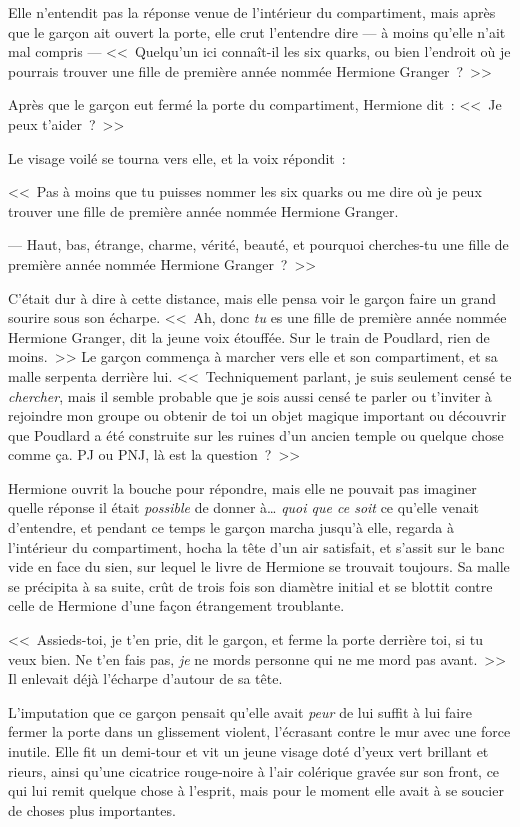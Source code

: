 Elle n'entendit pas la réponse venue de l'intérieur du compartiment, mais après que le garçon ait ouvert la porte, elle crut l'entendre dire — à moins qu'elle n'ait mal compris — <<~Quelqu'un ici connaît-il les six quarks, ou bien l'endroit où je pourrais trouver une fille de première année nommée Hermione Granger~?~>>

Après que le garçon eut fermé la porte du compartiment, Hermione dit~: <<~Je peux t'aider~?~>>

Le visage voilé se tourna vers elle, et la voix répondit~:

<<~Pas à moins que tu puisses nommer les six quarks ou me dire où je peux trouver une fille de première année nommée Hermione Granger.

--- Haut, bas, étrange, charme, vérité, beauté, et pourquoi cherches-tu une fille de première année nommée Hermione Granger~?~>>

C'était dur à dire à cette distance, mais elle pensa voir le garçon faire un grand sourire sous son écharpe. <<~Ah, donc \emph{tu} es une fille de première année nommée Hermione Granger, dit la jeune voix étouffée. Sur le train de Poudlard, rien de moins.~>> Le garçon commença à marcher vers elle et son compartiment, et sa malle serpenta derrière lui. <<~Techniquement parlant, je suis seulement censé te \emph{chercher}, mais il semble probable que je sois aussi censé te parler ou t'inviter à rejoindre mon groupe ou obtenir de toi un objet magique important ou découvrir que Poudlard a été construite sur les ruines d'un ancien temple ou quelque chose comme ça. PJ ou PNJ, là est la question~?~>>

Hermione ouvrit la bouche pour répondre, mais elle ne pouvait pas imaginer quelle réponse il était \emph{possible} de donner à… \emph{quoi que ce soit} ce qu'elle venait d'entendre, et pendant ce temps le garçon marcha jusqu'à elle, regarda à l'intérieur du compartiment, hocha la tête d'un air satisfait, et s'assit sur le banc vide en face du sien, sur lequel le livre de Hermione se trouvait toujours. Sa malle se précipita à sa suite, crût de trois fois son diamètre initial et se blottit contre celle de Hermione d'une façon étrangement troublante.

<<~Assieds-toi, je t'en prie, dit le garçon, et ferme la porte derrière toi, si tu veux bien. Ne t'en fais pas, \emph{je} ne mords personne qui ne me mord pas avant.~>> Il enlevait déjà l'écharpe d'autour de sa tête.

L'imputation que ce garçon pensait qu'elle avait \emph{peur} de lui suffit à lui faire fermer la porte dans un glissement violent, l'écrasant contre le mur avec une force inutile. Elle fit un demi-tour et vit un jeune visage doté d'yeux vert brillant et rieurs, ainsi qu'une cicatrice rouge-noire à l'air colérique gravée sur son front, ce qui lui remit quelque chose à l'esprit, mais pour le moment elle avait à se soucier de choses plus importantes.

